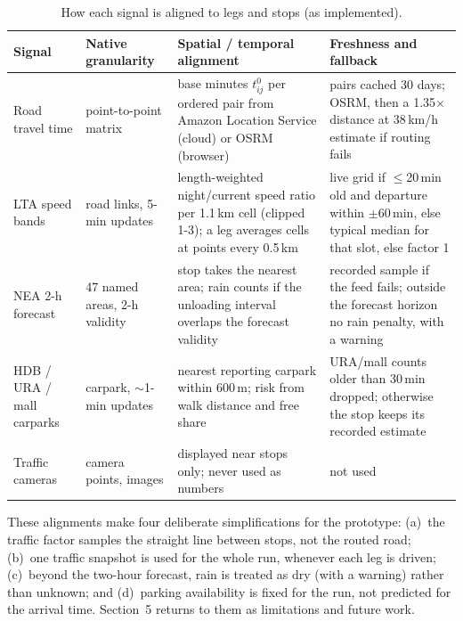 \documentclass[10.5pt,a4paper]{article}
\begin{document}
\begin{table}[h]
\centering\footnotesize
\caption{How each signal is aligned to legs and stops (as implemented).}\label{tab:fusion}
\begin{tabularx}{\linewidth}{@{}p{2.4cm}p{3.6cm}YY@{}}
\toprule
\textbf{Signal} & \textbf{Native granularity} & \textbf{Spatial / temporal alignment} & \textbf{Freshness and fallback} \\
\midrule
Road travel time & point-to-point matrix & base minutes $t^0_{ij}$ per ordered pair from Amazon Location Service (cloud) or OSRM (browser) & pairs cached 30 days; OSRM, then a 1.35$\times$ distance at 38\,km/h estimate if routing fails \\
LTA speed bands & road links, 5-min updates & length-weighted night/current speed ratio per 1.1\,km cell (clipped 1-3); a leg averages cells at points every 0.5\,km & live grid if $\le$20\,min old and departure within $\pm$60\,min, else typical median for that slot, else factor 1 \\
NEA 2-h forecast & 47 named areas, 2-h validity & stop takes the nearest area; rain counts if the unloading interval overlaps the forecast validity & recorded sample if the feed fails; outside the forecast horizon no rain penalty, with a warning \\
HDB / URA / mall carparks & carpark, $\sim$1-min updates & nearest reporting carpark within 600\,m; risk from walk distance and free share & URA/mall counts older than 30\,min dropped; otherwise the stop keeps its recorded estimate \\
Traffic cameras & camera points, images & displayed near stops only; never used as numbers & not used \\
\bottomrule
\end{tabularx}
\end{table}

These alignments make four deliberate simplifications for the prototype: (a)~the traffic factor samples the straight line
between stops, not the routed road; (b)~one traffic snapshot is used for the whole run, whenever each leg is driven;
(c)~beyond the two-hour forecast, rain is treated as dry (with a warning) rather than unknown; and (d)~parking availability is
fixed for the run, not predicted for the arrival time. Section~5 returns to them as limitations and future work.
\end{document}
